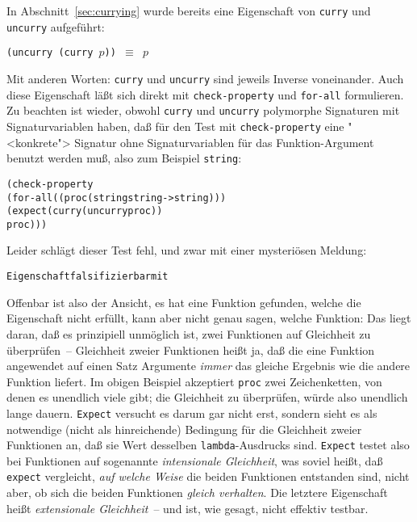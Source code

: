 In Abschnitt~\ref{sec:currying} wurde bereits eine Eigenschaft von
\texttt{curry} und
\texttt{uncurry} aufgeführt:
%
\begin{center}
  \texttt{(uncurry (curry \(p\))) \(\equiv\) \(p\)}
\end{center}
%
Mit anderen Worten: \texttt{curry} und \texttt{uncurry} sind jeweils
Inverse voneinander.  Auch diese Eigenschaft läßt sich direkt mit
\texttt{check-property} und \texttt{for-all} formulieren.  Zu beachten
ist wieder, obwohl \texttt{curry} und \texttt{uncurry} polymorphe
Signaturen mit Signaturvariablen haben, daß für den Test mit
\texttt{check-property} eine "<konkrete"> Signatur ohne
Signaturvariablen für das Funktion-Argument benutzt werden muß, also
zum Beispiel \texttt{string}:
%
\begin{alltt}
(check-property
 (for-all ((proc (string string -> string)))
   (expect (curry (uncurry proc))
           proc)))
\end{alltt}
%
Leider schlägt dieser Test fehl, und zwar mit einer mysteriösen
Meldung:
%
\begin{alltt}
Eigenschaft falsifizierbar mit 
\end{alltt}
%
Offenbar ist \drscheme{} also der Ansicht, es hat eine Funktion gefunden,
welche die Eigenschaft nicht erfüllt, kann aber nicht genau sagen,
welche Funktion: Das liegt daran, daß es prinzipiell unmöglich ist,
zwei Funktionen auf Gleichheit zu überprüfen~-- Gleichheit zweier
Funktionen heißt ja, daß die eine Funktion angewendet auf einen Satz
Argumente \emph{immer} das gleiche Ergebnis wie die andere Funktion
liefert.  Im obigen Beispiel akzeptiert \texttt{proc} zwei
Zeichenketten, von denen es unendlich viele gibt; die Gleichheit zu
überprüfen, würde also unendlich lange dauern.  \texttt{Expect}
versucht es darum gar nicht erst, sondern sieht es als notwendige
(nicht als hinreichende) Bedingung für die Gleichheit zweier
Funktionen an, daß sie Wert desselben \texttt{lambda}-Ausdrucks sind.
\texttt{Expect} testet also bei Funktionen auf sogenannte
\textit{intensionale Gleichheit}, was soviel heißt, daß
\texttt{expect} vergleicht, \emph{auf welche Weise} die beiden
Funktionen entstanden sind, nicht aber, ob sich die beiden Funktionen
\emph{gleich verhalten}.  Die letztere Eigenschaft heißt \textit{extensionale
  Gleichheit}~-- und ist, wie gesagt, nicht effektiv testbar.

